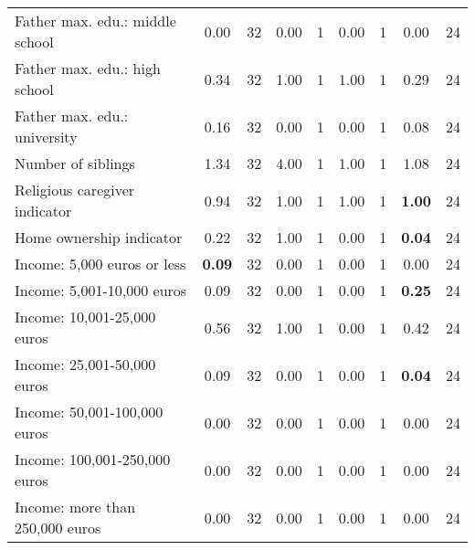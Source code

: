 \begin{tabular}{l c c c c c c c c}
Father max. edu.: middle school &      0.00 &        32 &      0.00 &         1 &      0.00 &         1 &      0.00 &        24 \\
Father max. edu.: high school &      0.34 &        32 &      1.00 &         1 &      1.00 &         1 &      0.29 &        24 \\
Father max. edu.: university &      0.16 &        32 &      0.00 &         1 &      0.00 &         1 &      0.08 &        24 \\
Number of siblings &      1.34 &        32 &      4.00 &         1 &      1.00 &         1 &      1.08 &        24 \\
Religious caregiver indicator &      0.94 &        32 &      1.00 &         1 &      1.00 &         1 & \textbf{     1.00} &        24 \\
Home ownership indicator &      0.22 &        32 &      1.00 &         1 &      0.00 &         1 & \textbf{     0.04} &        24 \\
Income: 5,000 euros or less & \textbf{     0.09} &        32 &      0.00 &         1 &      0.00 &         1 &      0.00 &        24 \\
Income: 5,001-10,000 euros &      0.09 &        32 &      0.00 &         1 &      0.00 &         1 & \textbf{     0.25} &        24 \\
Income: 10,001-25,000 euros &      0.56 &        32 &      1.00 &         1 &      0.00 &         1 &      0.42 &        24 \\
Income: 25,001-50,000 euros &      0.09 &        32 &      0.00 &         1 &      0.00 &         1 & \textbf{     0.04} &        24 \\
Income: 50,001-100,000 euros &      0.00 &        32 &      0.00 &         1 &      0.00 &         1 &      0.00 &        24 \\
Income: 100,001-250,000 euros &      0.00 &        32 &      0.00 &         1 &      0.00 &         1 &      0.00 &        24 \\
Income: more than 250,000 euros &      0.00 &        32 &      0.00 &         1 &      0.00 &         1 &      0.00 &        24 \\
\bottomrule
\end{tabular}
